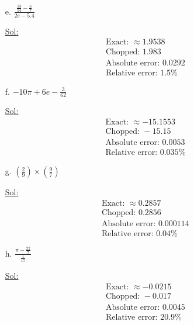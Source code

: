 \begin{enumerate}
\begin{itemize}
    \item[e.] \( \frac{\frac{13}{14} - \frac{6}{7}}{2e - 5.4} \)

      \underline{Sol:}\\
      \[
        \begin{array}{l}
          \textrm{Exact: } \approx 1.9538 \\
          \textrm{Chopped: } 1.983 \\
          \textrm{Absolute error: } 0.0292 \\
          \textrm{Relative error: } 1.5\%
        \end{array}
      \]
      \bigbreak

    \item[f.] \( -10\pi + 6e - \frac{3}{62} \)

      \underline{Sol:}\\
      \[
        \begin{array}{l}
          \textrm{Exact: } \approx -15.1553 \\
          \textrm{Chopped: } -15.15 \\
          \textrm{Absolute error: } 0.0053 \\
          \textrm{Relative error: } 0.035\%
        \end{array}
      \]
      \bigbreak

    \item[g.] \( \left( \frac{2}{9} \right) \times \left( \frac{9}{7} \right) \)

      \underline{Sol:}\\
      \[
        \begin{array}{l}
          \textrm{Exact: } \approx 0.2857 \\
          \textrm{Chopped: } 0.2856 \\
          \textrm{Absolute error: } 0.000114 \\
          \textrm{Relative error: } 0.04\%
        \end{array}
      \]
      \bigbreak

    \item[h.] \( \frac{\pi - \frac{22}{7}}{\frac{1}{17}} \)

      \underline{Sol:}\\
      \[
        \begin{array}{l}
          \textrm{Exact: } \approx -0.0215 \\
          \textrm{Chopped: } -0.017 \\
          \textrm{Absolute error: } 0.0045 \\
          \textrm{Relative error: } 20.9\%
        \end{array}
      \]
      \bigbreak
  \end{itemize}


\end{enumerate}
